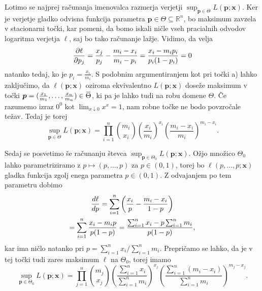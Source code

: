 \documentclass[a4paper,11pt]{article}
\newcommand{\ols}[1]{\mskip.5\thinmuskip\overline{\mskip-.5\thinmuskip {#1} \mskip-.5\thinmuskip}\mskip.5\thinmuskip} %
\newcommand{\sumin}{\sum_{i = 1}^n}
\newcommand{\R}{\mathbb{R}}
\begin{document}
Lotimo se najprej računanja imenovalca razmerja verjetji $\sup_{\bm{p} \in \Theta} L(\bm{p}; \bm{x})$. Ker je verjetje gladko odvisna funkcija parametra $\bm{p} \in \Theta \subseteq \R^n$, bo maksimum zavzela v stacionarni točki, kar pomeni, da bomo iskali ničle vseh pracialnih odvodov logaritma verjetja $\ell$, saj bo tako računanje lažje. Vidimo, da velja
\[
    \pdv{\ell}{p_j} (\bm{p}; \bm{x}) = 
    \frac{x_j}{p_j} - \frac{m_i - x_i}{m_i - p_i} = 
    \frac{x_i - m_i p_i}{p_i(1 - p_i)} = 0
\] 
natanko tedaj, ko je $p_i = \frac{x_i}{m_i}$. S podobnim argumentiranjem kot pri točki a) lahko zaključimo, da $\ell(\bm{p}; \bm{x})$ oziroma ekvivalentno $L(\bm{p}; \bm{x})$ doseže maksimum v točki $\bm{p} = (\frac{x_1}{m_1}, \dots, \frac{x_n}{m_n}) \in \ols\Theta$, ki pa je lahko tudi na robu domene $\Theta$. Če razumemo izraz $0^0$ kot $\lim_{x \downarrow 0}x^x = 1$, nam robne točke ne bodo povzročale težav. Tedaj je torej 
\[
    \sup_{\bm{p} \in \Theta} L(\bm{p}; \bm{x}) = 
    \prod_{i = 1}^n \binom{m_i}{x_i} \left(\frac{x_i}{m_i}\right)^{x_i} \left(\frac{m_i - x_i}{m_i}\right)^{m_i - x_i}.
\]

Sedaj se posvetimo še računanju števca $\sup_{\bm{p} \in \Theta_0} L(\bm{p}; \bm{x})$. Ožjo množico $\Theta_0$ lahko parametriziramo z $p \mapsto (p,\dots, p)$ za $p \in (0,1)$, torej bo $\ell(p, \dots, p; \bm{x})$ gladka funkcija zgolj enega parametra $p \in (0,1)$. Z odvajanjem po tem parametru dobimo 
\begin{multline*}
    \derivative{\ell}{p} (p, \dots, p; \bm{x}) = 
    \sumin \left(\frac{x_i}{p} - \frac{m_i - x_i}{1 - p}\right) \\ = 
    \sumin \frac{x_i - m_i p}{p(1-p)} = 
    \frac{\sumin x_i - p \sumin m_i}{p(1-p)},
\end{multline*}
kar ima ničlo natanko pri $p = \sumin x_i / \sumin m_i$. Prepričamo se lahko, da je v tej točki tudi zares maksimum $\ell$ na $\Theta_0$, torej imamo
\[
    \sup_{\bm{p} \in \Theta_0} L(\bm{p}; \bm{x}) = 
    \prod_{j = 1}^n \binom{m_j}{x_j} \left(\frac{\sumin x_i}{\sumin m_i}\right)^{x_j} \left(\frac{\sumin(m_i - x_i)}{\sumin m_i}\right)^{m_j - x_j}.
\]
\end{document}
